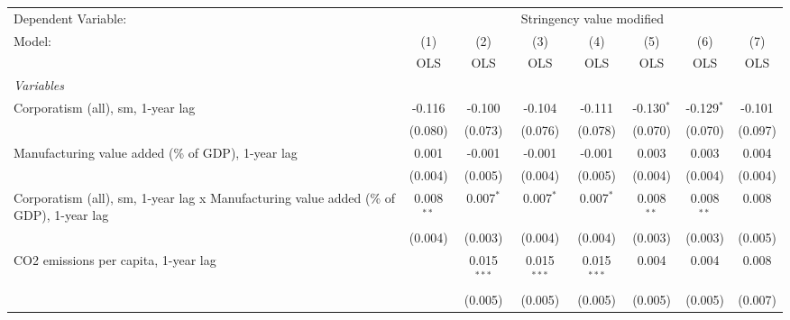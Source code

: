 
\begingroup
\centering
\begin{tabular}{lccccccc}
   \toprule
   Dependent Variable: & \multicolumn{7}{c}{Stringency value modified}\\
   Model:                                                                                 & (1)          & (2)           & (3)           & (4)           & (5)          & (6)          & (7)\\  
                                                                                          &  OLS         & OLS           & OLS           & OLS           & OLS          & OLS          & OLS\\  
   \midrule
   \emph{Variables}\\
   Corporatism (all), sm, 1-year lag                                                      & -0.116       & -0.100        & -0.104        & -0.111        & -0.130$^{*}$ & -0.129$^{*}$ & -0.101\\   
                                                                                          & (0.080)      & (0.073)       & (0.076)       & (0.078)       & (0.070)      & (0.070)      & (0.097)\\   
   Manufacturing value added (\% of GDP), 1-year lag                                      & 0.001        & -0.001        & -0.001        & -0.001        & 0.003        & 0.003        & 0.004\\   
                                                                                          & (0.004)      & (0.005)       & (0.004)       & (0.005)       & (0.004)      & (0.004)      & (0.004)\\   
   Corporatism (all), sm, 1-year lag x Manufacturing value added (\% of GDP), 1-year lag  & 0.008$^{**}$ & 0.007$^{*}$   & 0.007$^{*}$   & 0.007$^{*}$   & 0.008$^{**}$ & 0.008$^{**}$ & 0.008\\   
                                                                                          & (0.004)      & (0.003)       & (0.004)       & (0.004)       & (0.003)      & (0.003)      & (0.005)\\   
   CO2 emissions per capita, 1-year lag                                                   &              & 0.015$^{***}$ & 0.015$^{***}$ & 0.015$^{***}$ & 0.004        & 0.004        & 0.008\\   
                                                                                          &              & (0.005)       & (0.005)       & (0.005)       & (0.005)      & (0.005)      & (0.007)\\   

\end{tabular}
